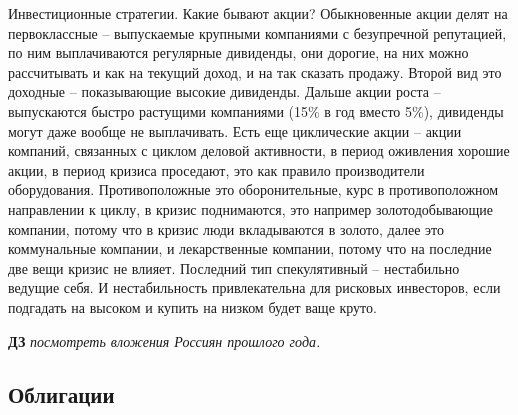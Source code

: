\documentclass[a4paper, 12pt]{article}
\begin{document}
Инвестиционные стратегии. Какие бывают акции? Обыкновенные акции делят на первоклассные -- выпускаемые крупными компаниями с безупречной репутацией, по ним выплачиваются регулярные дивиденды, они дорогие, на них можно рассчитывать и как на текущий доход, и на так сказать продажу. Второй вид это доходные -- показывающие высокие дивиденды. Дальше акции роста -- выпускаются быстро растущими компаниями (15\% в год вместо 5\%), дивиденды могут даже вообще не выплачивать. Есть еще циклические акции -- акции компаний, связанных с циклом деловой активности, в период оживления хорошие акции, в период кризиса проседают, это как правило производители оборудования. Противоположные это оборонительные, курс в противоположном направлении к циклу, в кризис поднимаются, это например золотодобывающие компании, потому что в кризис люди вкладываются в золото, далее это коммунальные компании, и лекарственные компании, потому что на последние две вещи кризис не влияет. Последний тип спекулятивный -- нестабильно ведущие себя. И нестабильность привлекательна для рисковых инвесторов, если подгадать на высоком и купить на низком будет ваще круто. 

\textbf{ДЗ} \textit{посмотреть вложения Россиян прошлого года.}

\subsection{Облигации}
\end{document}
